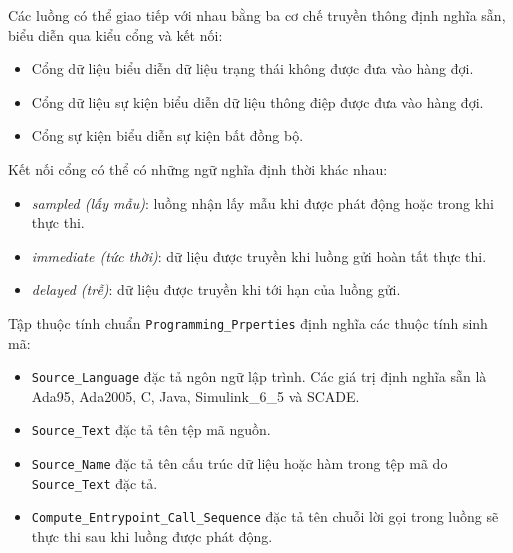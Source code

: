Các luồng có thể giao tiếp với nhau bằng ba cơ chế truyền thông định nghĩa sẵn, biểu diễn qua kiểu cổng và kết nối:
\begin{itemize}
\item Cổng dữ liệu biểu diễn dữ liệu trạng thái không được đưa vào hàng đợi.
\item Cổng dữ liệu sự kiện biểu diễn dữ liệu thông điệp được đưa vào hàng đợi.
\item Cổng sự kiện biểu diễn sự kiện bất đồng bộ.
\end{itemize}

Kết nối cổng có thể có những ngữ nghĩa định thời khác nhau:
\begin{itemize}
\item \emph{sampled (lấy mẫu)}: luồng nhận lấy mẫu khi được phát động hoặc trong khi thực thi.
\item \emph{immediate (tức thời)}: dữ liệu được truyền khi luồng gửi hoàn tất thực thi.
\item \emph{delayed (trễ)}: dữ liệu được truyền khi tới hạn của luồng gửi.
\end{itemize}

Tập thuộc tính chuẩn \texttt{Programming\_Prperties} định nghĩa các thuộc tính sinh mã:
\begin{itemize}
\item \texttt{Source\_Language} đặc tả ngôn ngữ lập trình. Các giá trị định nghĩa sẵn là Ada95, Ada2005, C, Java, Simulink\_6\_5 và SCADE.
\item \texttt{Source\_Text} đặc tả tên tệp mã nguồn.
\item \texttt{Source\_Name} đặc tả tên cấu trúc dữ liệu hoặc hàm trong tệp mã do \texttt{Source\_Text} đặc tả.
\item \texttt{Compute\_Entrypoint\_Call\_Sequence} đặc tả tên chuỗi lời gọi trong luồng sẽ thực thi sau khi luồng được phát động.
\end{itemize}


